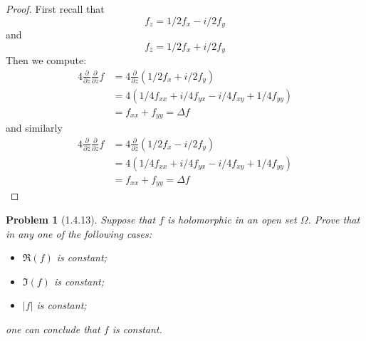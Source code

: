 \documentclass[10pt]{article}
\newcommand{\sk}{\vskip 10mm}
\newcommand{\conj}[1]{\overline{#1}}
\theoremstyle{plain}
\newtheorem{problem}{Problem}
\theoremstyle{remark}
\begin{document}
\begin{proof}
  First recall that
  \[
    f_z=1/2f_x-i/2f_y
  \]
  and
  \[
    f_{\conj{z}}=1/2f_x+i/2f_y
  \]
  Then we compute:
  \begin{align*}
    4\frac{\partial}{\partial z}\frac{\partial}{\partial\conj{z}}f &= 4\frac{\partial}{\partial z}(1/2f_x+i/2f_y)\\
                                                           &= 4(1/4f_{xx}+i/4f_{yx}-i/4f_{xy}+1/4f_{yy})\\
                                                           &= f_{xx}+f_{yy} = \Delta f
  \end{align*}
  and similarly
  \begin{align*}
    4\frac{\partial}{\partial \conj{z}}\frac{\partial}{\partial z}f &= 4\frac{\partial}{\partial \conj{z}}(1/2f_x-i/2f_y)\\
                                                           &= 4(1/4f_{xx}+i/4f_{yx}-i/4f_{xy}+1/4f_{yy})\\
                                                           &= f_{xx}+f_{yy} = \Delta f
  \end{align*}
\end{proof}

\sk

\begin{problem}[1.4.13]
  Suppose that $f$ is holomorphic in an open set $\Omega$. Prove that in any one
  of the following cases:
  \begin{itemize}
  \item[(a)] $\Re(f)$ is constant;
  \item[(b)] $\Im(f)$ is constant;
  \item[(c)] $|f|$ is constant;
  \end{itemize}
  one can conclude that $f$ is constant.
\end{problem}
\end{document}
